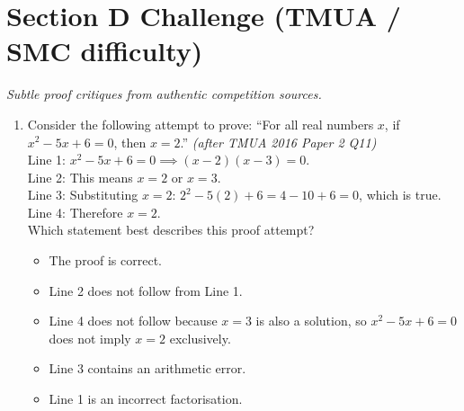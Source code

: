 \documentclass[11pt,a4paper]{article}
\begin{document}
\section*{Section D \quad Challenge \hfill{\normalfont\small(TMUA / SMC difficulty)}}

\noindent\textit{Subtle proof critiques from authentic competition sources.}

\begin{enumerate}

\item Consider the following attempt to prove: ``For all real numbers $x$, if $x^2 - 5x + 6 = 0$, then $x = 2$.'' \textit{\small(after TMUA 2016 Paper 2 Q11)}\\
Line 1: $x^2 - 5x + 6 = 0 \implies (x-2)(x-3) = 0$.\\
Line 2: This means $x = 2$ or $x = 3$.\\
Line 3: Substituting $x = 2$: $2^2 - 5(2) + 6 = 4 - 10 + 6 = 0$, which is true.\\
Line 4: Therefore $x = 2$.\\
Which statement best describes this proof attempt?
\begin{itemize}
\item[A)] The proof is correct.
\item[B)] Line 2 does not follow from Line 1.
\item[C)] Line 4 does not follow because $x = 3$ is also a solution, so $x^2 - 5x + 6 = 0$ does not imply $x = 2$ exclusively.
\item[D)] Line 3 contains an arithmetic error.
\item[E)] Line 1 is an incorrect factorisation.
\end{itemize}


\end{enumerate}
\end{document}
